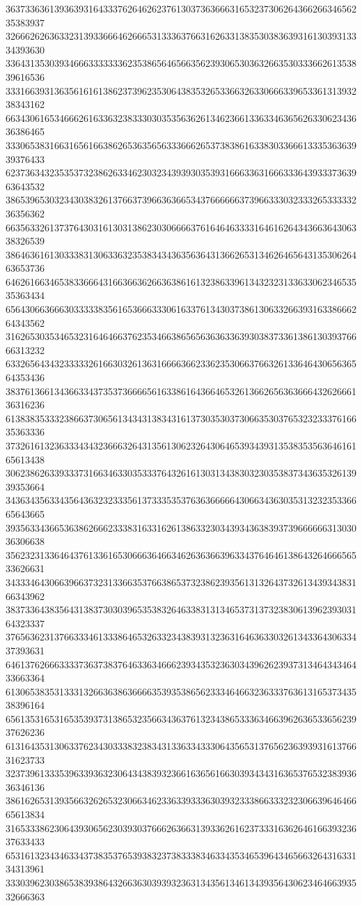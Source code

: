 36373363613936393164333762646262376130373636663165323730626436626634656235383937
32666262636332313933666462666531333637663162633138353038363931613039313334393630
33643135303934666333333362353865646566356239306530363266353033366261353839616536
33316639313635616161386237396235306438353265336632633066633965336131393238343162
66343061653466626163363238333030353563626134623661336334636562633062343636386465
33306538316631656166386265363565633366626537383861633830336661333536363939376433
62373634323535373238626334623032343939303539316663363166633364393337363963643532
38653965303234303832613766373966363665343766666637396633303233326533333236356362
66356332613737643031613031386230306666376164646333316461626434366364306338326539
38646361613033383130633632353834343635636431366265313462646564313530626463653736
64626166346538336664316636636266363861613238633961343232313363306234653535363434
65643066366630333338356165366633306163376134303738613063326639316338666264343562
31626530353465323164646637623534663865656363633639303837336138613039376666313232
63326564343233333261663032613631666636623362353066376632613364643065636564353436
38376136613436633437353736666561633861643664653261366265636366643262666136316236
61383835333238663730656134343138343161373035303730663530376532323337616635363336
37326161323633343432366632643135613062326430646539343931353835356364616165613438
30623862633933373166346330353337643261613031343830323035383734363532613939353664
34363435633435643632323335613733353537636366666430663436303531323235336665643665
39356334366536386266623338316331626138633230343934363839373966666631303036306638
35623231336464376133616530666364663462636366396334376464613864326466656533626631
34333464306639663732313366353766386537323862393561313264373261343934383166343962
38373364383564313837303039653538326463383131346537313732383061396239303164323337
37656362313766333461333864653263323438393132363164636330326134336430633437393631
64613762666333373637383764633634666239343532363034396262393731346434346433663364
61306538353133313266363863666635393538656233346466323633376361316537343538396164
65613531653165353937313865323566343637613234386533363466396263653365623937626236
61316435313063376234303338323834313363343330643565313765623639393161376631623733
32373961333539633936323064343839323661636561663039343431636537653238393636346136
38616265313935663262653230663462336339333630393233386633323230663964646665613834
31653338623064393065623039303766626366313933626162373331636264616639323637633433
65316132343463343738353765393832373833383463343534653964346566326431633134313961
33303962303865383938643266363039393236313435613461343935643062346466393532666363
